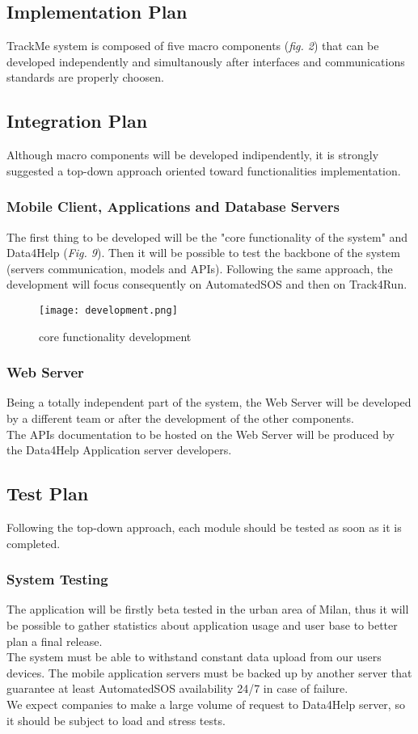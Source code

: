 \documentclass[../main.tex]{subfiles}
\begin{document}
\subsection{Implementation Plan}
TrackMe system is composed of five macro components (\textit{fig. 2}) that can be developed independently and simultanously
after interfaces and communications standards are properly choosen.\\



\subsection{Integration Plan}
Although macro components will be developed indipendently, it is strongly suggested a top-down approach oriented toward functionalities
implementation. 
 \subsubsection{Mobile Client, Applications and Database Servers}
    The first thing to be developed will be the "core functionality of the system" and Data4Help (\textit{Fig. 9}). Then it will be possible
    to test the backbone of the system (servers communication, models and APIs). Following the same approach, the development will focus consequently on
    AutomatedSOS and then on Track4Run.

    \begin{figure}[ht]
        \centering
             \texttt{[image: development.png]}
              \caption{core functionality development}
               \label{fig:development}
    \end{figure}
 \subsubsection{Web Server}
    Being a totally independent part of the system, the Web Server will be developed by a different team or after the development of the other components.\\
    The APIs documentation to be hosted on the Web Server will be produced by the Data4Help Application server developers. 
\subsection{Test Plan}
    Following the top-down approach, each module should be tested as soon as it is completed.
\subsubsection{System Testing}
    The application will be firstly beta tested in the urban area of Milan, thus it will be possible
    to gather statistics about application usage and user base to better plan a final release.\\
    The system must be able to withstand constant data upload from our users devices. The mobile application servers must be backed up
    by another server that guarantee at least AutomatedSOS availability 24/7 in case of failure.\\
    We expect companies to make a large volume of request to Data4Help server, so it should be subject to load and stress tests.
 
\end{document}
